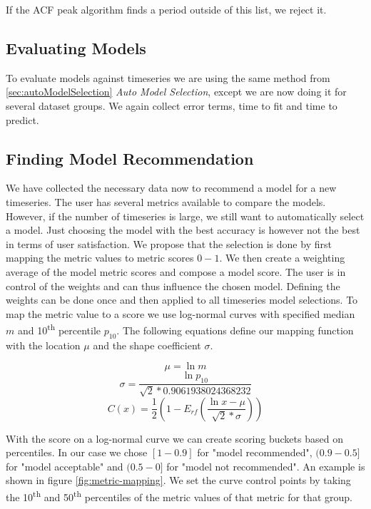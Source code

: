 If the ACF peak algorithm finds a period outside of this list, we reject it.

\subsection{Evaluating Models}

To evaluate models against timeseries we are using the same method from \ref{sec:autoModelSelection} \emph{Auto Model Selection}, except we are now doing it for several dataset groups. We again collect error terms, time to fit and time to predict.

\subsection{Finding Model Recommendation}

We have collected the necessary data now to recommend a model for a new timeseries. The user has several metrics available to compare the models. However, if the number of timeseries is large, we still want to automatically select a model. Just choosing the model with the best accuracy is however not the best in terms of user satisfaction. We propose that the selection is done by first mapping the metric values to metric scores $0-1$. We then create a weighting average of the model metric scores and compose a model score. The user is in control of the weights and can thus influence the chosen model. Defining the weights can be done once and then applied to all timeseries model selections.
To map the metric value to a score we use log-normal curves with specified median $m$ and 10\textsuperscript{th} percentile $p_{10}$. The following equations define our mapping function with the location $\mu$ and the shape coefficient $\sigma$.

\begin{equation}
    \mu = \ln{m}
\end{equation}
\begin{equation}
    \sigma = \frac{\ln{p_{10}}}{\sqrt{2}*0.9061938024368232}
\end{equation}
\begin{equation}
    C(x)=\frac{1}{2}(1-E_{rf}(\frac{\ln{x} - \mu}{\sqrt{2}*\sigma}))
    \label{eq:logNormal}
\end{equation}

With the score on a log-normal curve we can create scoring buckets based on percentiles. In our case we chose $[1-0.9]$ for "model recommended", $(0.9-0.5]$ for "model acceptable" and $(0.5-0]$ for "model not recommended". An example is shown in figure \ref{fig:metric-mapping}. We set the curve control points by taking the 10\textsuperscript{th} and 50\textsuperscript{th} percentiles of the metric values of that metric for that group.

